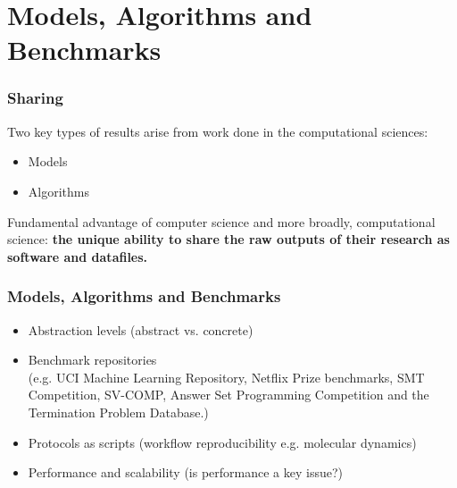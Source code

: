 \documentclass[pdftex]{beamer}
\begin{document}
{ %
    \begin{frame}[plain]
     \end{frame}
}

\section{Models, Algorithms and Benchmarks}

\begin{frame}
\frametitle{Sharing}
Two key types of results arise from work done in the computational sciences:
\begin{itemize}
\item Models
\item Algorithms
\end{itemize}
\vspace{1em}
Fundamental advantage of computer science and more broadly,
computational science: {\textbf{the unique ability to share the raw outputs of
their research as software and datafiles.}}
\end{frame}

\begin{frame}
\frametitle{Models, Algorithms and Benchmarks}
\begin{itemize}
\item Abstraction levels ({\scriptsize{abstract vs. concrete}})
\item Benchmark repositories\\({\scriptsize{e.g. UCI Machine Learning Repository, Netflix Prize benchmarks, SMT Competition, SV-COMP, Answer Set Programming Competition and the Termination Problem Database.}})
\item Protocols as scripts ({\scriptsize{workflow reproducibility e.g. molecular dynamics}})
\item Performance and scalability ({\scriptsize{is performance a key issue?}})
\end{itemize}
\pause
{}
\end{frame}
\end{document}
